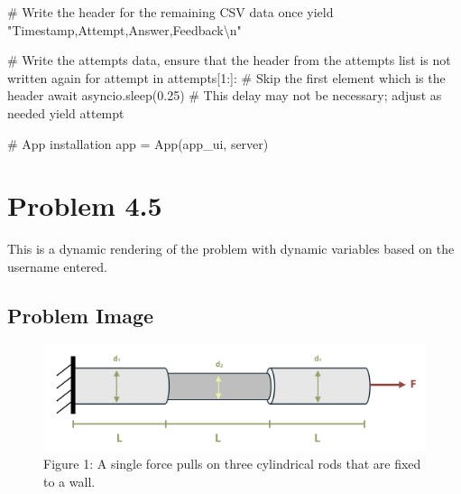 \documentclass[
  letterpaper,
  DIV=11,
  numbers=noendperiod]{scrreprt}
\newenvironment{Shaded}{\begin{snugshade}}{\end{snugshade}}
\newcommand{\NormalTok}[1]{\textcolor[rgb]{0.00,0.23,0.31}{#1}}
\begin{document}
\begin{Shaded}
\begin{Highlighting}[]
\NormalTok{        \# Write the header for the remaining CSV data once}
\NormalTok{        yield "Timestamp,Attempt,Answer,Feedback\textbackslash{}n"}
        
\NormalTok{        \# Write the attempts data, ensure that the header from the attempts list is not written again}
\NormalTok{        for attempt in attempts[1:]:  \# Skip the first element which is the header}
\NormalTok{            await asyncio.sleep(0.25)  \# This delay may not be necessary; adjust as needed}
\NormalTok{            yield attempt}


\NormalTok{\# App installation}
\NormalTok{app = App(app\_ui, server)}
\end{Highlighting}
\end{Shaded}

\chapter*{Problem 4.5}\label{problem-4.5}


This is a dynamic rendering of the problem with dynamic variables based
on the username entered.

\section*{Problem Image}\label{problem-image-32}


\begin{figure}[H]

{\centering \includegraphics{images/188.png}

}

\caption{Figure 1: A single force pulls on three cylindrical rods that
are fixed to a wall.}

\end{figure}%
\end{document}
